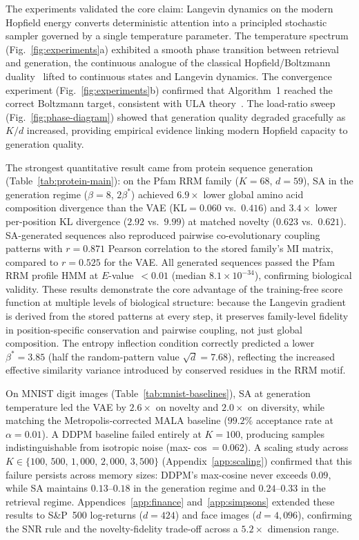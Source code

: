 
The experiments validated the core claim: Langevin dynamics on the modern Hopfield energy converts deterministic attention into a principled stochastic sampler governed by a single temperature parameter. The temperature spectrum (Fig.~\ref{fig:experiments}a) exhibited a smooth phase transition between retrieval and generation, the continuous analogue of the classical Hopfield/Boltzmann duality~\cite{ackeleyLearningAlgorithmBoltzmann1985} lifted to continuous states and Langevin dynamics. The convergence experiment (Fig.~\ref{fig:experiments}b) confirmed that Algorithm~1 reached the correct Boltzmann target, consistent with ULA theory~\cite{durmusNonasymptoticAnalysisUnadjusted2017}. The load-ratio sweep (Fig.~\ref{fig:phase-diagram}) showed that generation quality degraded gracefully as $K/d$ increased, providing empirical evidence linking modern Hopfield capacity to generation quality.

The strongest quantitative result came from protein sequence generation (Table~\ref{tab:protein-main}): on the Pfam RRM family ($K{=}68$, $d{=}59$), SA in the generation regime ($\beta{=}8$, $2\beta^*$) achieved $6.9{\times}$ lower global amino acid composition divergence than the VAE (KL${=}0.060$ vs.\ $0.416$) and $3.4{\times}$ lower per-position KL divergence ($2.92$ vs.\ $9.99$) at matched novelty ($0.623$ vs.\ $0.621$). SA-generated sequences also reproduced pairwise co-evolutionary coupling patterns with $r{=}0.871$ Pearson correlation to the stored family's MI matrix, compared to $r{=}0.525$ for the VAE. All generated sequences passed the Pfam RRM profile HMM at $E$-value~$<0.01$ (median $8.1{\times}10^{-34}$), confirming biological validity. These results demonstrate the core advantage of the training-free score function at multiple levels of biological structure: because the Langevin gradient is derived from the stored patterns at every step, it preserves family-level fidelity in position-specific conservation and pairwise coupling, not just global composition. The entropy inflection condition correctly predicted a lower $\beta^*{=}3.85$ (half the random-pattern value $\sqrt{d}{=}7.68$), reflecting the increased effective similarity variance introduced by conserved residues in the RRM motif.

On MNIST digit images (Table~\ref{tab:mnist-baselines}), SA at generation temperature led the VAE by $2.6{\times}$ on novelty and $2.0{\times}$ on diversity, while matching the Metropolis-corrected MALA baseline ($99.2\%$ acceptance rate at $\alpha{=}0.01$). A DDPM baseline failed entirely at $K{=}100$, producing samples indistinguishable from isotropic noise (max-$\cos{=}0.062$). A scaling study across $K\in\{100,\,500,\,1{,}000,\,2{,}000,\,3{,}500\}$ (Appendix~\ref{app:scaling}) confirmed that this failure persists across memory sizes: DDPM's max-cosine never exceeds $0.09$, while SA maintains $0.13$--$0.18$ in the generation regime and $0.24$--$0.33$ in the retrieval regime. Appendices~\ref{app:finance} and~\ref{app:simpsons} extended these results to S\&P~500 log-returns ($d{=}424$) and face images ($d{=}4{,}096$), confirming the SNR rule and the novelty-fidelity trade-off across a $5.2{\times}$ dimension range.

